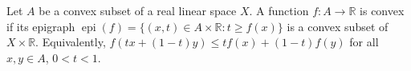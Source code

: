 Let $A$ be a convex subset of a real linear space $X$. A function $f: A \to \mathbb{R}$ is convex if its epigraph $\operatorname{epi}(f) = \{(x,t) \in A \times \mathbb{R} : t \geqslant f(x)\}$ is a convex subset of $X \times \mathbb{R}$. Equivalently, $f(tx + (1-t)y) \leqslant tf(x) + (1-t)f(y)$ for all $x, y \in A$, $0 < t < 1$.